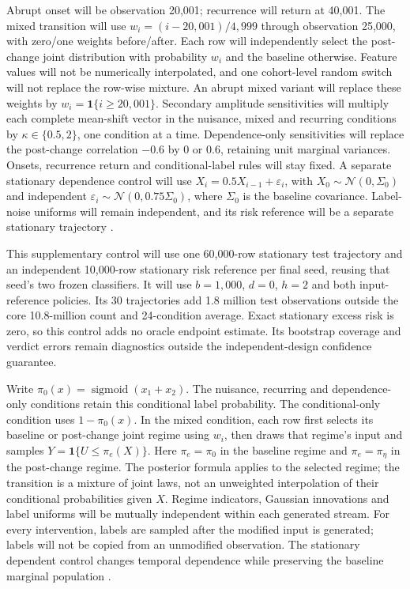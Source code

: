 \documentclass[11pt,a4paper]{article}
\newcommand{\ind}{\mathbf{1}}
\begin{document}
Abrupt onset will be observation 20,001; recurrence will return at 40,001.
The mixed transition will use
$w_i=(i-20{,}001)/4{,}999$ through observation 25,000, with zero/one weights
before/after. Each row will independently select the post-change joint
distribution with probability $w_i$ and the baseline otherwise. Feature values
will not be numerically interpolated, and one cohort-level random switch will
not replace the row-wise mixture. An abrupt mixed variant will replace
these weights by $w_i=\ind\{i\geq20{,}001\}$. Secondary amplitude
sensitivities will multiply each complete mean-shift vector in the nuisance,
mixed and recurring conditions by $\kappa\in\{0.5,2\}$,
one condition at a time. Dependence-only sensitivities will replace the
post-change correlation $-0.6$ by 0 or 0.6, retaining unit marginal variances.
Onsets, recurrence return and conditional-label rules will stay fixed.
A separate stationary dependence control will use
$X_i=0.5X_{i-1}+\varepsilon_i$, with
$X_0\sim\mathcal N(0,\Sigma_0)$ and independent
$\varepsilon_i\sim\mathcal N(0,0.75\Sigma_0)$, where $\Sigma_0$ is the
baseline covariance. Label-noise uniforms will remain independent, and its
risk reference will be a separate stationary trajectory \cite{souza}.

This supplementary control will use one 60,000-row stationary test trajectory
and an independent 10,000-row stationary risk reference per final seed,
reusing that seed's two frozen classifiers. It will use $b=1{,}000$,
$d=0$, $h=2$ and both input-reference policies. Its 30 trajectories add
1.8 million test observations outside the core 10.8-million count and
24-condition average. Exact stationary excess risk is zero, so this control
adds no oracle endpoint estimate. Its bootstrap coverage and verdict errors
remain diagnostics outside the independent-design confidence guarantee.

Write $\pi_0(x)=\operatorname{sigmoid}(x_1+x_2)$. The nuisance, recurring
and dependence-only conditions retain this conditional label probability.
The conditional-only condition uses $1-\pi_0(x)$. In the mixed condition,
each row first selects its baseline or post-change joint regime using $w_i$,
then draws that regime's input and samples $Y=\ind\{U\leq\pi_e(X)\}$.
Here $\pi_e=\pi_0$ in the baseline regime and $\pi_e=\pi_\eta$ in the
post-change regime. The posterior formula applies to the selected regime;
the transition is a mixture of joint laws, not an unweighted interpolation
of their conditional probabilities given $X$.
Regime indicators, Gaussian innovations and label uniforms will be mutually
independent within each generated stream.
For every intervention, labels are sampled after the modified input is
generated; labels will not be copied from an unmodified observation. The stationary
dependent control changes temporal dependence while preserving the baseline
marginal population \cite{souza,window}.
\end{document}
